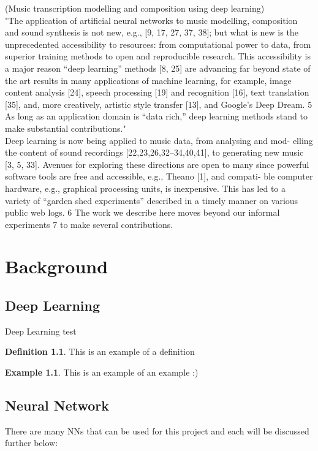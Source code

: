 \documentclass[12pt, a4paper]{report}
\theoremstyle{definition}
\newtheorem{definition}{Definition}[section]
\theoremstyle{definition}%
\newtheorem{example}{Example}[section]
\theoremstyle{definition}%
\theoremstyle{definition}%
\theoremstyle{definition}%
\theoremstyle{definition}%
\begin{document}
(Music transcription modelling and composition using deep learning)\\
"The application of artificial neural networks to music modelling, composition
and sound synthesis is not new, e.g., [9, 17, 27, 37, 38]; but what is new is the
unprecedented accessibility to resources: from computational power to data, from
superior training methods to open and reproducible research. This accessibility
is a major reason “deep learning” methods [8, 25] are advancing far beyond
state of the art results in many applications of machine learning, for example,
image content analysis [24], speech processing [19] and recognition [16], text
translation [35], and, more creatively, artistic style transfer [13], and Google’s
Deep Dream. 5 As long as an application domain is “data rich,” deep learning
methods stand to make substantial contributions." \\

Deep learning is now being applied to music data, from analysing and mod-
elling the content of sound recordings [22,23,26,32–34,40,41], to generating new
music [3, 5, 33]. Avenues for exploring these directions are open to many since
powerful software tools are free and accessible, e.g., Theano [1], and compati-
ble computer hardware, e.g., graphical processing units, is inexpensive. This has
led to a variety of “garden shed experiments” described in a timely manner on
various public web logs. 6 The work we describe here moves beyond our informal
experiments 7 to make several contributions.



\chapter{Background}

	\section{Deep Learning}
	Deep Learning test

		\begin{definition}
		This is an example of a definition
		\end{definition}

		\begin{example}
		This is an example of an example :)
		\end{example}
	
	\section{Neural Network}
	There are many NNs that can be used for this project and each will be discussed further below:
	
\end{document}
